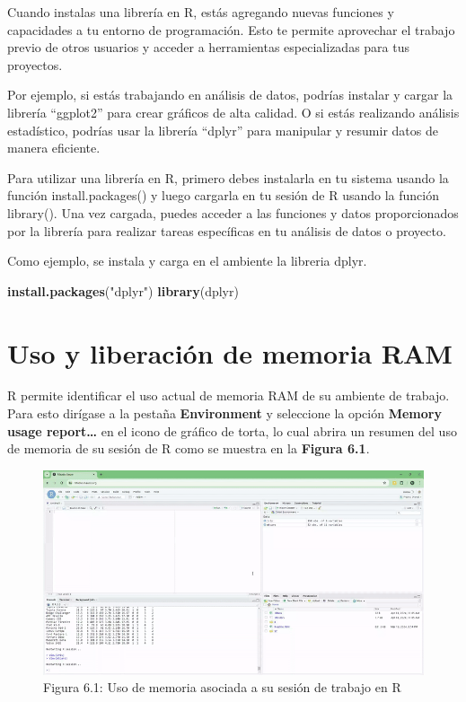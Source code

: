\documentclass[
]{article}
\newenvironment{Shaded}{\begin{snugshade}}{\end{snugshade}}
\newcommand{\FunctionTok}[1]{\textcolor[rgb]{0.13,0.29,0.53}{\textbf{#1}}}
\newcommand{\NormalTok}[1]{#1}
\newcommand{\StringTok}[1]{\textcolor[rgb]{0.31,0.60,0.02}{#1}}
\begin{document}
Cuando instalas una librería en R, estás agregando nuevas funciones y
capacidades a tu entorno de programación. Esto te permite aprovechar el
trabajo previo de otros usuarios y acceder a herramientas especializadas
para tus proyectos.

Por ejemplo, si estás trabajando en análisis de datos, podrías instalar
y cargar la librería ``ggplot2'' para crear gráficos de alta calidad. O
si estás realizando análisis estadístico, podrías usar la librería
``dplyr'' para manipular y resumir datos de manera eficiente.

Para utilizar una librería en R, primero debes instalarla en tu sistema
usando la función install.packages() y luego cargarla en tu sesión de R
usando la función library(). Una vez cargada, puedes acceder a las
funciones y datos proporcionados por la librería para realizar tareas
específicas en tu análisis de datos o proyecto.

Como ejemplo, se instala y carga en el ambiente la libreria dplyr.

\begin{Shaded}
\begin{Highlighting}[]
\FunctionTok{install.packages}\NormalTok{(}\StringTok{"dplyr"}\NormalTok{)}
\FunctionTok{library}\NormalTok{(dplyr)}
\end{Highlighting}
\end{Shaded}

\section{\texorpdfstring{\textbf{Uso y liberación de memoria
RAM}}{Uso y liberación de memoria RAM}}\label{uso-y-liberaciuxf3n-de-memoria-ram}

R permite identificar el uso actual de memoria RAM de su ambiente de
trabajo. Para esto dirígase a la pestaña \textbf{Environment} y
seleccione la opción \textbf{Memory usage report\ldots{}} en el icono de
gráfico de torta, lo cual abrira un resumen del uso de memoria de su
sesión de R como se muestra en la \textbf{Figura 6.1}.

\begin{figure}

{\centering \includegraphics[width=800px]{images/gif_memoria} 

}

\caption{Figura 6.1: Uso de memoria asociada a su sesión de trabajo en R}\label{fig:memoria}
\end{figure}
\end{document}

